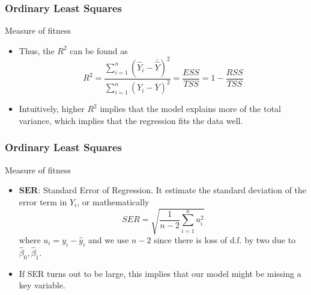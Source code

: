 \documentclass[compress]{beamer}
\begin{document}
\begin{frame}
\frametitle{Ordinary Least Squares}
Measure of fitness
\begin{itemize}
\item Thus, the $R^2$ can be found as
\[
R^2 = \frac{\sum_{i=1}^n (\hat{Y}_i - \bar{\hat{Y}})^2}{\sum_{i=1}^n (Y_i-\bar{Y})^2} = \frac{ESS}{TSS} = 1-\frac{RSS}{TSS}
\]
\item Intuitively, higher $R^2$ implies that the model explains more of the total variance, which implies that the regression fits the data well. 
\end{itemize}
\end{frame}


\begin{frame}
\frametitle{Ordinary Least Squares}
Measure of fitness
\begin{itemize}
\item  $\mathbf{SER}$: Standard Error of Regression. It estimate the standard deviation of the error term in $Y_i$, or mathematically
\[
SER = \sqrt{\frac{1}{n-2}\sum_{i=1}^n u_i^2}
\]
where $u_i = y_i-\hat{y}_i$ and we use $n-2$ since there is loss of d.f. by two due to $\hat{\beta}_0, \hat{\beta}_1$. 
\item If SER turns out to be large, this implies that our model might be missing a key variable.
\end{itemize}
\end{frame}
\end{document}
